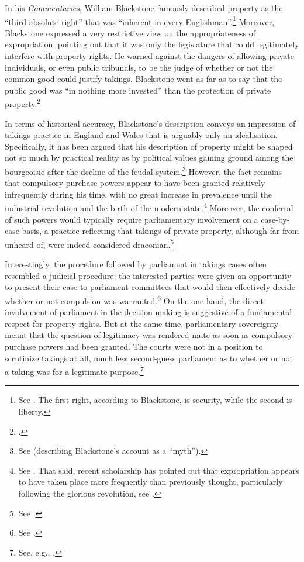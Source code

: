 In his {\it Commentaries}, William Blackstone famously described property as the ``third absolute right'' that was ``inherent in every Englishman''.\footnote{See \cite[134-135]{blackstone79}. The first right, according to Blackstone, is security, while the second is liberty.} Moreover, Blackstone expressed a very restrictive view on the appropriateness of expropriation, pointing out that it was only the legislature that could legitimately interfere with property rights. He warned against the dangers of allowing private individuals, or even public tribunals, to be the judge of whether or not the common good could justify takings. Blackstone went as far as to say that the public good was ``in nothing more invested'' than the protection of private property.\footcite[134-135]{blackstone79}

In terms of historical accuracy, Blackstone's description conveys an impression of takings practice in England and Wales that is arguably only an idealisation. Specifically, it has been argued that his description of property might be shaped not so much by practical reality as by political values gaining ground among the bourgeoisie after the decline of the feudal system.\footnote{See \cite[34-35]{waring09} (describing Blackstone's account as a ``myth'').} However, the fact remains that compulsory purchase powers appear to have been granted relatively infrequently during his time, with no great increase in prevalence until the industrial revolution and the birth of the modern state.\footnote{See \cite[15]{allen00}. That said, recent scholarship has pointed out that expropriation appears to have taken place more frequently than previously thought, particularly following the glorious revolution, see \cite{hoppit11}.} Moreover, the conferral of such powers would typically require parliamentary involvement on a case-by-case basis, a practice reflecting that takings of private property, although far from unheard of, were indeed considered draconian.\footnote{See \cite[43-46]{nulty12}.}

Interestingly, the procedure followed by parliament in takings cases often resembled a judicial procedure; the interested parties were given an opportunity to present their case to parliament committees that would then effectively decide whether or not compulsion was warranted.\footnote{See \cite[13-16]{allen00}.} On the one hand, the direct involvement of parliament in the decision-making is suggestive of a fundamental respect for property rights. But at the same time, parliamentary sovereignty meant that the question of legitimacy was rendered mute as soon as compulsory purchase powers had been granted. The courts were not in a position to scrutinize takings at all, much less second-guess parliament as to whether or not a taking was for a legitimate purpose.\footnote{See, e.g., \cite[643]{nulty12}.}


